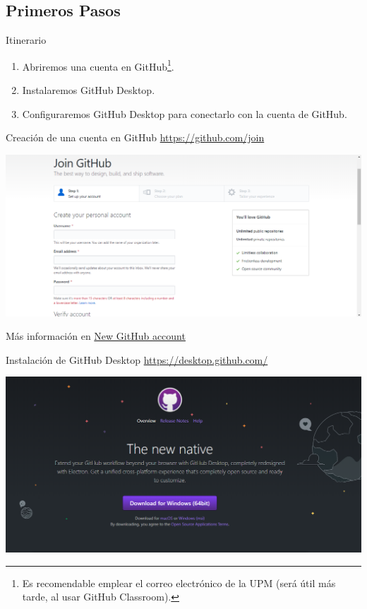 \documentclass[aspectratio=169, xcolor={usenames,svgnames,dvipsnames}]{beamer}
\begin{document}
\subsection{Primeros Pasos}
\label{sec:org3540832}
\begin{frame}[label={sec:org5eff2d4}]{Itinerario}
\begin{enumerate}
\item Abriremos una cuenta en GitHub\footnote{Es recomendable emplear el correo electrónico de la UPM (será útil más tarde, al usar GitHub Classroom).}.
\item Instalaremos GitHub Desktop.
\item Configuraremos GitHub Desktop para conectarlo con la cuenta de GitHub.
\end{enumerate}
\end{frame}

\begin{frame}[label={sec:org6aad832}]{Creación de una cuenta en GitHub}
\url{https://github.com/join}

\begin{center}
\includegraphics[width=.9\linewidth]{figs/GitHub_Join.png}
\end{center}

Más información en \href{https://help.github.com/articles/signing-up-for-a-new-github-account/}{New GitHub account}
\end{frame}

\begin{frame}[label={sec:orgd5b72a8}]{Instalación de GitHub Desktop}
\url{https://desktop.github.com/}

\begin{center}
\includegraphics[width=.9\linewidth]{figs/GitHub_Desktop.png}
\end{center}
\end{frame}
\end{document}

